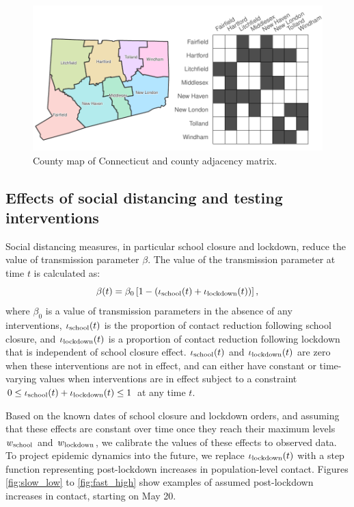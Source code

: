 \documentclass[11pt]{article}
\begin{document}
\begin{figure} %
	\centering
	\includegraphics[width=.7\textwidth]{figures/map_adj.pdf}
	\caption{County map of Connecticut and county adjacency matrix.}
	\label{fig:map}
\end{figure}




\subsection{Effects of social distancing and testing interventions} 

Social distancing measures, in particular school closure and lockdown, reduce the value of transmission parameter $\beta$. The value of the transmission parameter at time $t$ is calculated as:
\[ \beta(t) = \beta_0 \left[ 1 - ( \iota\textsubscript{school}(t) + \iota\textsubscript{lockdown} (t)) \right] , \]
where $\beta_0$ is a value of transmission parameters in the absence of any interventions, $\iota\textsubscript{school}(t)$ is the proportion of contact reduction following school closure, and $\iota\textsubscript{lockdown} (t)$ is a proportion of contact reduction following lockdown that is independent of school closure effect. $\iota\textsubscript{school}(t)$ and $\iota\textsubscript{lockdown} (t)$ are zero when these interventions are not in effect, and can either have constant or time-varying values when interventions are in effect subject to a constraint $ 0 \le \iota\textsubscript{school}(t) + \iota\textsubscript{lockdown} (t) \le 1 $ at any time $t$.

Based on the known dates of school closure and lockdown orders, and assuming that these effects are constant over time once they reach their maximum levels $w\textsubscript{school}$ and $w\textsubscript{lockdown}$, we calibrate the values of these effects to observed data. To project epidemic dynamics into the future, we replace  $\iota\textsubscript{lockdown} (t)$ with a step function representing post-lockdown increases in population-level contact.  Figures \ref{fig:slow_low} to \ref{fig:fast_high} show examples of assumed post-lockdown increases in contact, starting on May 20. 
\end{document}
